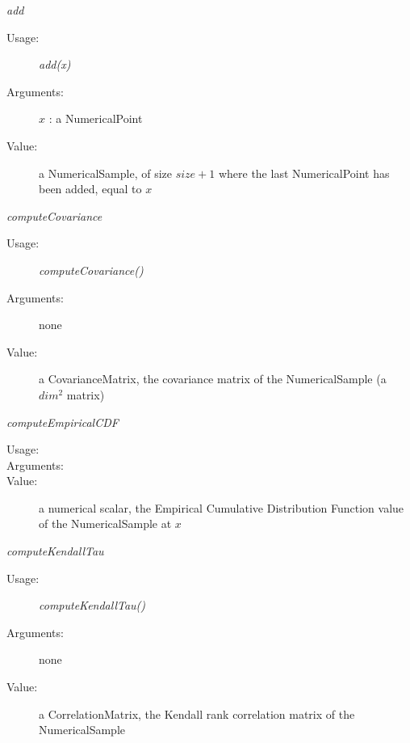 \begin{description}
\begin{description}
\item \textit{add}
\begin{description}
\item[Usage:] \textit{add(x)}
\item[Arguments:] $x$ : a NumericalPoint
\item[Value:] a NumericalSample, of size $size+1$ where the last NumericalPoint has been added, equal to $x$
\end{description}
\bigskip


\item \textit{computeCovariance}
\begin{description}
\item[Usage:] \textit{computeCovariance()}
\item[Arguments:] none
\item[Value:] a CovarianceMatrix, the covariance matrix of the NumericalSample (a $dim^2$ matrix)
\end{description}
\bigskip

\item \textit{computeEmpiricalCDF}
\begin{description}
\item[Usage:]  \rule{0pt}{1em}
\item[Arguments:] \rule{0pt}{1em}

\item[Value:] a numerical scalar, the Empirical Cumulative Distribution Function value of the NumericalSample at $x$
\end{description}
\bigskip


\item \textit{computeKendallTau}
\begin{description}
\item[Usage:] \textit{computeKendallTau()}
\item[Arguments:] none
\item[Value:] a CorrelationMatrix,  the Kendall rank correlation matrix of the NumericalSample
\end{description}
\bigskip



\end{description}
\end{description}
